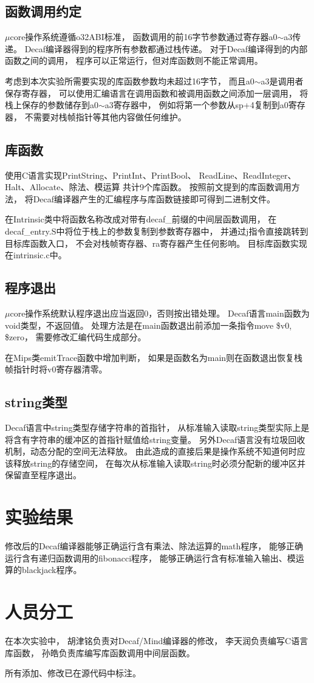     \subsection{函数调用约定}
        $\mu$core操作系统遵循o32ABI标准，%
        函数调用的前16字节参数通过寄存器a0$\sim$a3传递。%
        Decaf编译器得到的程序所有参数都通过栈传递。%
        对于Decaf编译得到的内部函数之间的调用，%
        程序可以正常运行，但对库函数则不能正常调用。

        考虑到本次实验所需要实现的库函数参数均未超过16字节，%
        而且a0$\sim$a3是调用者保存寄存器，%
        可以使用汇编语言在调用函数和被调用函数之间添加一层调用，%
        将栈上保存的参数储存到a0$\sim$a3寄存器中，%
        例如将第一个参数从sp+4复制到a0寄存器，%
        不需要对栈帧指针等其他内容做任何维护。

    \subsection{库函数}
        使用C语言实现PrintString、PrintInt、PrintBool、%
        ReadLine、ReadInteger、Halt、Allocate、除法、模运算%
        共计9个库函数。%
        按照前文提到的库函数调用方法，%
        将Decaf编译器产生的汇编程序与库函数链接即可得到二进制文件。
        
        在Intrinsic类中将函数名称改成对带有decaf\_前缀的中间层函数调用，%
        在decaf\_entry.S中将位于栈上的参数复制到参数寄存器中，%
        并通过j指令直接跳转到目标库函数入口，%
        不会对栈帧寄存器、ra寄存器产生任何影响。%
        目标库函数实现在intrinsic.c中。%

    \subsection{程序退出}
        $\mu$core操作系统默认程序退出应当返回0，否则按出错处理。%
        Decaf语言main函数为void类型，不返回值。%
        处理方法是在main函数退出前添加一条指令move \$v0, \$zero，%
        需要修改汇编代码生成部分。

        在Mips类emitTrace函数中增加判断，%
        如果是函数名为main则在函数退出恢复栈帧指针时将v0寄存器清零。

    \subsection{string类型}
        Decaf语言中string类型存储字符串的首指针，%
        从标准输入读取string类型实际上是%
        将含有字符串的缓冲区的首指针赋值给string变量。%
        另外Decaf语言没有垃圾回收机制，动态分配的空间无法释放。%
        由此造成的直接后果是操作系统不知道何时应该释放string的存储空间，%
        在每次从标准输入读取string时必须分配新的缓冲区并保留直至程序退出。


\section{实验结果}
    修改后的Decaf编译器能够正确运行含有乘法、除法运算的math程序，%
    能够正确运行含有递归函数调用的fibonacci程序，%
    能够正确运行含有标准输入输出、模运算的blackjack程序。

\section{人员分工}
    在本次实验中，%
    胡津铭负责对Decaf/Mind编译器的修改，%
    李天润负责编写C语言库函数，%
    孙皓负责库编写库函数调用中间层函数。

    所有添加、修改已在源代码中标注。
